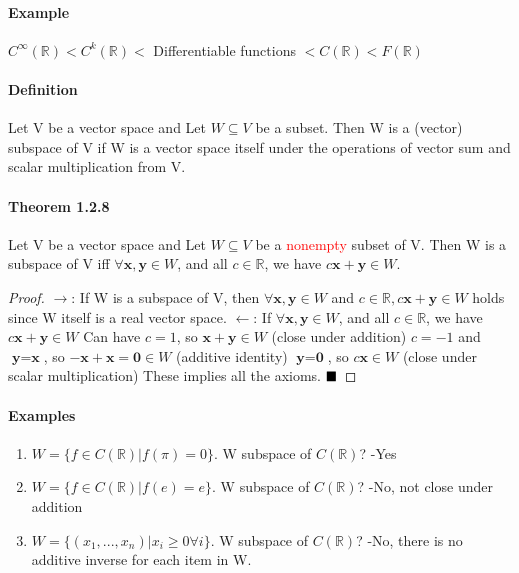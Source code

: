 \documentclass[11pt]{article}
\newcommand{\tb}[1]{\textbf{#1}}
\newcommand{\qed}[0]{$\hfill\blacksquare$}
\newcommand{\real}[0]{\mathbb{R}}
\newcommand{\vx}[0]{\tb{x}}
\newcommand{\vy}[0]{\tb{y}}
\newcommand{\vo}[0]{\tb{0}}
\begin{document}
	\paragraph{Example}
	$C^\infty(\real) < C^k(\real) <$ Differentiable functions $< C(\real) < F(\real)$  
	\paragraph{Definition} Let V be a vector space and Let $W \subseteq V$ be a subset. Then W is a (vector) subspace of V if W is a vector space itself under the operations of vector sum and scalar multiplication from V.
	\paragraph{Theorem 1.2.8}  Let V be a vector space and Let $W \subseteq V$ be a \textcolor{red}{nonempty} subset of V. Then W is a subspace of V iff $\forall \vx, \vy \in W$, and all $c \in \real$, we have $c\vx + \vy \in W$. \newline
	\begin{proof}
	$\rightarrow$: If W is a subspace of V, then $\forall \vx, \vy \in W$ and $c \in \real, c\vx + \vy \in W$ holds since W itself is a real vector space. \newline
	$\leftarrow$: If $\forall \vx, \vy \in W$, and all $c \in \real$, we have $c\vx + \vy \in W$ \newline
	Can have $c = 1$, so $\vx + \vy \in W$ (close under addition) \newline
	$c = -1$ and $\vy = \vx$, so $-\vx + \vx = \vo \in W$ (additive identity) \newline
	$\vy = \vo$, so  $c\vx \in W$ (close under scalar multiplication) \newline
	These implies all the axioms. \qed
	\end{proof}

	\paragraph{Examples}
	\begin{enumerate}
		\item $W = \{f\in C(\real) | f(\pi) = 0\}$. W subspace of $C(\real)$? -Yes
		\item $W = \{f\in C(\real) | f(e) = e\}$. W subspace of $C(\real)$? -No, not close under addition
		\item $W = \{(x_1,...,x_n) | x_i\geq 0 \forall i\}$. W subspace of $C(\real)$? -No, there is no additive inverse for each item in W.
	\end{enumerate}
\end{document}
